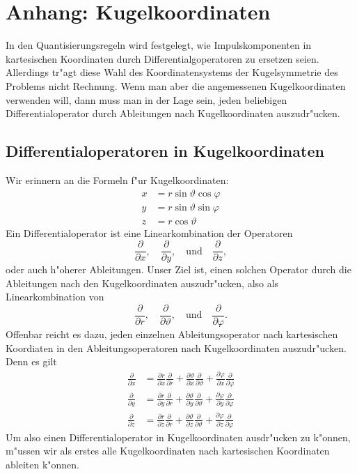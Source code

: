 \chapter{Anhang: Kugelkoordinaten\label{chapter:kugelkoordinaten}}
\rhead{}
In den Quantisierungsregeln wird festgelegt, wie Impulskomponenten
in kartesischen Koordinaten durch Differentialgoperatoren zu
ersetzen seien.
Allerdings tr"agt diese Wahl des Koordinatensystems der Kugelsymmetrie
des Problems nicht Rechnung. 
Wenn man aber die angemessenen Kugelkoordinaten verwenden will,
dann muss man in der Lage sein, jeden beliebigen Differentialoperator
durch Ableitungen nach Kugelkoordinaten auszudr"ucken.

\section{Differentialoperatoren in Kugelkoordinaten}
Wir erinnern an die Formeln f"ur Kugelkoordinaten:
\begin{align*}
x&=
r\sin\vartheta\cos\varphi
\\
y&=
r\sin\vartheta\sin\varphi
\\
z&=
r\cos\vartheta
\end{align*}
Ein Differentialoperator ist eine Linearkombination der Operatoren
\[
\frac{\partial}{\partial x},
\quad
\frac{\partial}{\partial y},
\quad\text{und}\quad
\frac{\partial}{\partial z},
\]
oder auch h"oherer Ableitungen.  Unser Ziel ist, einen solchen Operator
durch die Ableitungen nach den Kugelkoordinaten auszudr"ucken, also
als Linearkombination von
\[
\frac{\partial}{\partial r},
\quad
\frac{\partial}{\partial \vartheta},
\quad\text{und}\quad
\frac{\partial}{\partial \varphi}.
\]
Offenbar reicht es dazu, jeden einzelnen Ableitungsoperator nach kartesischen
Koordiaten in den Ableitungsoperatoren nach Kugelkoordinaten auszudr"ucken.
Denn es gilt
\begin{align*}
\frac{\partial}{\partial x}
&=
\frac{\partial r}{\partial x} \frac{\partial}{\partial r}
+
\frac{\partial \vartheta}{\partial x} \frac{\partial}{\partial \vartheta}
+
\frac{\partial \varphi}{\partial x} \frac{\partial}{\partial \varphi}
\\
\frac{\partial}{\partial y}
&=
\frac{\partial r}{\partial y} \frac{\partial}{\partial r}
+
\frac{\partial \vartheta}{\partial y} \frac{\partial}{\partial \vartheta}
+
\frac{\partial \varphi}{\partial y} \frac{\partial}{\partial \varphi}
\\
\frac{\partial}{\partial z}
&=
\frac{\partial r}{\partial z} \frac{\partial}{\partial r}
+
\frac{\partial \vartheta}{\partial z} \frac{\partial}{\partial \vartheta}
+
\frac{\partial \varphi}{\partial z} \frac{\partial}{\partial \varphi}
\end{align*}
Um also einen Differentialoperator in Kugelkoordinaten ausdr"ucken zu
k"onnen, m"ussen wir als erstes alle Kugelkoordinaten nach kartesischen
Koordinaten ableiten k"onnen.

